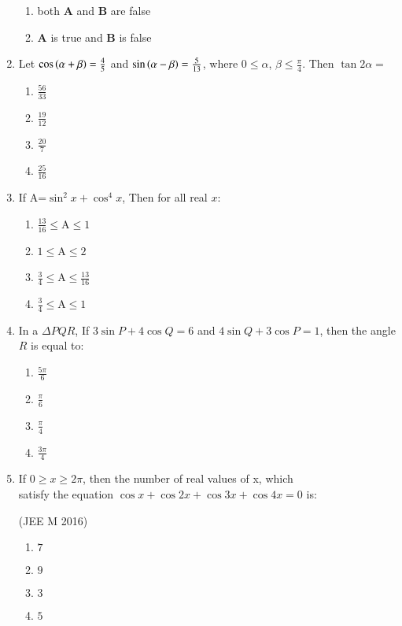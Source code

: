 \begin{enumerate}[label=\thesubsection.\arabic*,ref=\thesubsection.\theenumi]
\begin{enumerate}
\item both \textbf{A} and \textbf{B} are false 
\item \textbf{A} is true and \textbf{B} is false
\end{enumerate}
\item Let $\cos\left(\alpha+\beta\right)=\frac{4}{5}$  and $\sin\left(\alpha-\beta\right)=\frac{5}{13}$, where $0\le\alpha$, $\beta\le\frac{\pi}{4}$. Then $\tan2\alpha=$ \hfill{}
\begin{multicols}{4}
\begin{enumerate}
\item $\frac{56}{33}$
\columnbreak
\item $\frac{19}{12}$
\columnbreak
\item $\frac{20}{7}$
\columnbreak
\item $\frac{25}{16}$
\end{enumerate} 
\end{multicols}
\item If A=$\sin^2x +\cos^4 x$, Then for all real $x$:
\hfill{}
\begin{multicols}{2} 
\begin{enumerate}
\item $\frac{13}{16}\le$A$\le1$
\item $1\le$A$\le2$
\columnbreak
\item $\frac{3}{4}\le$A$\le\frac{13}{16}$
\item $\frac{3}{4}\le$A$\le1$
\end{enumerate} 
\end{multicols}
\item In a ${\Delta PQR}$, If $3 \sin {P} + 4 \cos {Q}=6$ and $4\sin {Q}+3\cos {P}=1$, then the angle ${R}$ is equal to:
\hfill{}
\begin{multicols}{4}
\begin{enumerate}
\item $\frac{5\pi}{6}$
\columnbreak
\item $\frac{\pi}{6}$
\columnbreak
\item $\frac{\pi}{4}$
\columnbreak
\item $\frac{3\pi}{4}$
\end{enumerate} 
\end{multicols}
\item If $0 \ge x \ge 2\pi$, then the number of real values of x, which \\  satisfy the equation $\cos x+\cos2x+\cos3x+\cos4x=0$ is:

\hfill {(JEE M 2016)}\\
    \begin{enumerate}
    \item $7$
    \item $9$
    \item $3$
    \item $5$
    \end{enumerate}
    

\end{enumerate}
